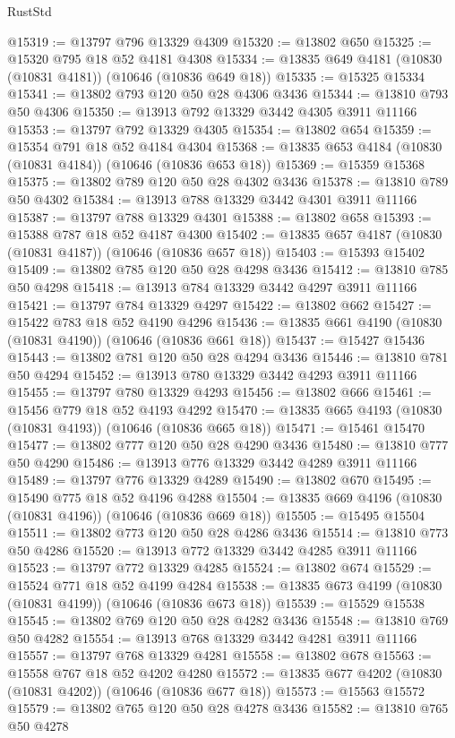 \begin{lexlean}{RustStd}
\begin{coremodule}
@15319 := @13797 @796 @13329 @4309
@15320 := @13802 @650
@15325 := @15320 @795 @18 @52 @4181 @4308
@15334 := @13835 @649 @4181 (@10830 (@10831 @4181)) (@10646 (@10836 @649 @18))
@15335 := @15325 @15334
@15341 := @13802 @793 @120 @50 @28 @4306 @3436
@15344 := @13810 @793 @50 @4306
@15350 := @13913 @792 @13329 @3442 @4305 @3911 @11166
@15353 := @13797 @792 @13329 @4305
@15354 := @13802 @654
@15359 := @15354 @791 @18 @52 @4184 @4304
@15368 := @13835 @653 @4184 (@10830 (@10831 @4184)) (@10646 (@10836 @653 @18))
@15369 := @15359 @15368
@15375 := @13802 @789 @120 @50 @28 @4302 @3436
@15378 := @13810 @789 @50 @4302
@15384 := @13913 @788 @13329 @3442 @4301 @3911 @11166
@15387 := @13797 @788 @13329 @4301
@15388 := @13802 @658
@15393 := @15388 @787 @18 @52 @4187 @4300
@15402 := @13835 @657 @4187 (@10830 (@10831 @4187)) (@10646 (@10836 @657 @18))
@15403 := @15393 @15402
@15409 := @13802 @785 @120 @50 @28 @4298 @3436
@15412 := @13810 @785 @50 @4298
@15418 := @13913 @784 @13329 @3442 @4297 @3911 @11166
@15421 := @13797 @784 @13329 @4297
@15422 := @13802 @662
@15427 := @15422 @783 @18 @52 @4190 @4296
@15436 := @13835 @661 @4190 (@10830 (@10831 @4190)) (@10646 (@10836 @661 @18))
@15437 := @15427 @15436
@15443 := @13802 @781 @120 @50 @28 @4294 @3436
@15446 := @13810 @781 @50 @4294
@15452 := @13913 @780 @13329 @3442 @4293 @3911 @11166
@15455 := @13797 @780 @13329 @4293
@15456 := @13802 @666
@15461 := @15456 @779 @18 @52 @4193 @4292
@15470 := @13835 @665 @4193 (@10830 (@10831 @4193)) (@10646 (@10836 @665 @18))
@15471 := @15461 @15470
@15477 := @13802 @777 @120 @50 @28 @4290 @3436
@15480 := @13810 @777 @50 @4290
@15486 := @13913 @776 @13329 @3442 @4289 @3911 @11166
@15489 := @13797 @776 @13329 @4289
@15490 := @13802 @670
@15495 := @15490 @775 @18 @52 @4196 @4288
@15504 := @13835 @669 @4196 (@10830 (@10831 @4196)) (@10646 (@10836 @669 @18))
@15505 := @15495 @15504
@15511 := @13802 @773 @120 @50 @28 @4286 @3436
@15514 := @13810 @773 @50 @4286
@15520 := @13913 @772 @13329 @3442 @4285 @3911 @11166
@15523 := @13797 @772 @13329 @4285
@15524 := @13802 @674
@15529 := @15524 @771 @18 @52 @4199 @4284
@15538 := @13835 @673 @4199 (@10830 (@10831 @4199)) (@10646 (@10836 @673 @18))
@15539 := @15529 @15538
@15545 := @13802 @769 @120 @50 @28 @4282 @3436
@15548 := @13810 @769 @50 @4282
@15554 := @13913 @768 @13329 @3442 @4281 @3911 @11166
@15557 := @13797 @768 @13329 @4281
@15558 := @13802 @678
@15563 := @15558 @767 @18 @52 @4202 @4280
@15572 := @13835 @677 @4202 (@10830 (@10831 @4202)) (@10646 (@10836 @677 @18))
@15573 := @15563 @15572
@15579 := @13802 @765 @120 @50 @28 @4278 @3436
@15582 := @13810 @765 @50 @4278

\end{coremodule}
\end{lexlean}
